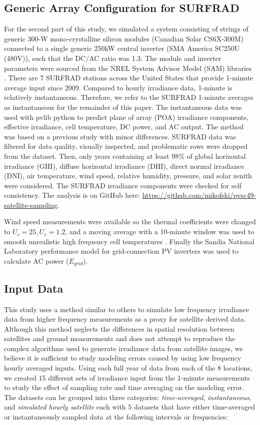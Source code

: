 \documentclass[conference]{IEEEtran}
\begin{document}
\subsection{Generic Array Configuration for SURFRAD}
For the second part of this study, we simulated a system consisting of strings of generic 300-W mono-crystalline silicon modules (Canadian Solar CS6X-300M) connected to a single generic 250kW central inverter (SMA America SC250U (480V)), such that the DC/AC ratio was 1.3. The module and inverter parameters were sourced from the NREL System Advisor Model (SAM) libraries \cite{Freeman2018}. There are 7 SURFRAD \cite{Augustine2000} stations across the United States that provide 1-minute average input since 2009. Compared to hourly irradiance data, 1-minute is relatively instantaneous. Therefore, we refer to the SURFRAD 1-minute averages as instantaneous for the remainder of this paper. The instantaneous data was used with pvlib python \cite{pvlib2018} to predict plane of array (POA) irradiance components, effective irradiance, cell temperature, DC power, and AC output. The method was based on a previous study \cite{9519024} with minor differences. SURFRAD data was filtered for data quality, visually inspected, and problematic rows were dropped from the dataset. Then, only years containing at least 98\% of global horizontal irradiance (GHI), diffuse horizontal irradiance (DHI), direct normal irradiance (DNI), air temperature, wind speed, relative humidity, pressure, and solar zenith were considered. The SURFRAD irradiance components were checked for self consistency. The analysis is on GitHub here: \url{https://github.com/mikofski/pvsc49-satellite-sampling}.

Wind speed measurements were available so the thermal coefficients were changed to $U_c=25, U_v=1.2$, and a moving average with a 10-minute window was used to smooth unrealistic high frequency cell temperatures \cite{9095219}. Finally the Sandia National Laboratory performance model for grid-connection PV inverters \cite{King2007} was used to calculate AC power ($E_{grid}$).

\subsection{Input Data}
This study uses a method similar to others to simulate low frequency irradiance data from higher frequency measurements \cite{Bowersox2021,osti_1797569} as a proxy for satellite derived data. Although this method neglects the differences in spatial resolution between satellites and ground measurements and does not attempt to reproduce the complex algorithms used to generate irradiance data from satellite images, we believe it is sufficient to study modeling errors caused by using low frequency hourly averaged inputs. Using each full year of data from each of the 8 locations, we created 15 different sets of irradiance input from the 1-minute measurements to study the effect of sampling rate and time averaging on the modeling error. The datasets can be grouped into three categories: \emph{time-averaged}, \emph{instantaneous}, and \emph{simulated hourly satellite} each with 5 datasets that have either time-averaged or instantaneously sampled data at the following intervals or frequencies:
\end{document}
